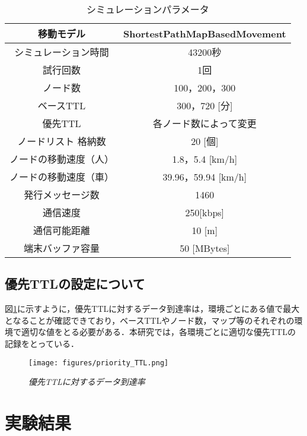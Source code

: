 \documentclass[11pt]{icsthesis}
\begin{document}
\begin{table}[h]
    \begin{center}
      \caption[]{シミュレーションパラメータ}
      \label{simpara}
      \begin{tabular}{|c|c|}
        \hline
        移動モデル & ShortestPathMapBasedMovement\\
        \hline
        シミュレーション時間 & 43200秒\\
        \hline
        試行回数 & 1回\\
        \hline
        ノード数 & 100，200，300\\
        \hline
        ベースTTL & 300，720 [分]\\
        \hline
        優先TTL & 各ノード数によって変更\\
        \hline
        ノードリスト
        格納数 & 20 [個]\\
        \hline
        ノードの移動速度（人） & 1.8，5.4 [km/h]\\
        \hline
        ノードの移動速度（車） & 39.96，59.94 [km/h]\\
        \hline
        発行メッセージ数 & 1460\\
        \hline
        通信速度 & 250[kbps]\\
        \hline
        通信可能距離 & 10 [m]\\
        \hline
        端末バッファ容量 & 50 [MBytes]\\
        \hline
      \end{tabular}
    \end{center}
\end{table}

\section{優先TTLの設定について}
図\ref{priorityTTL}に示すように，優先TTLに対するデータ到達率は，環境ごとにある値で最大となることが確認できており，ベースTTLやノード数，マップ等のそれぞれの環境で適切な値をとる必要がある．本研究では，各環境ごとに適切な優先TTLの記録をとっている．
\begin{figure}[H]
	\centering
	\texttt{[image: figures/priority\_TTL.png]}
	\caption[]{\it{優先TTLに対するデータ到達率}}
	\label{priorityTTL}
\end{figure}
\chapter{実験結果}
\end{document}
